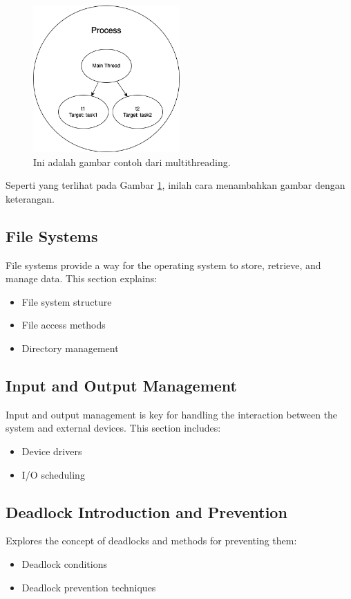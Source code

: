 \documentclass[12pt]{article}
\begin{document}
\begin{figure}[h]
    \centering
    \includegraphics[width=0.5\textwidth]{asset/example.png}  %
    \caption{Ini adalah gambar contoh dari multithreading.}
    \label{fig:contoh_gambar}
\end{figure}

Seperti yang terlihat pada Gambar \ref{fig:contoh_gambar}, inilah cara menambahkan gambar dengan keterangan.

\subsection{File Systems}
File systems provide a way for the operating system to store, retrieve, and manage data. This section explains:
\begin{itemize}
    \item File system structure
    \item File access methods
    \item Directory management
\end{itemize}

\subsection{Input and Output Management}
Input and output management is key for handling the interaction between the system and external devices. This section includes:
\begin{itemize}
    \item Device drivers
    \item I/O scheduling
\end{itemize}

\subsection{Deadlock Introduction and Prevention}
Explores the concept of deadlocks and methods for preventing them:
\begin{itemize}
    \item Deadlock conditions
    \item Deadlock prevention techniques
\end{itemize}
\end{document}
